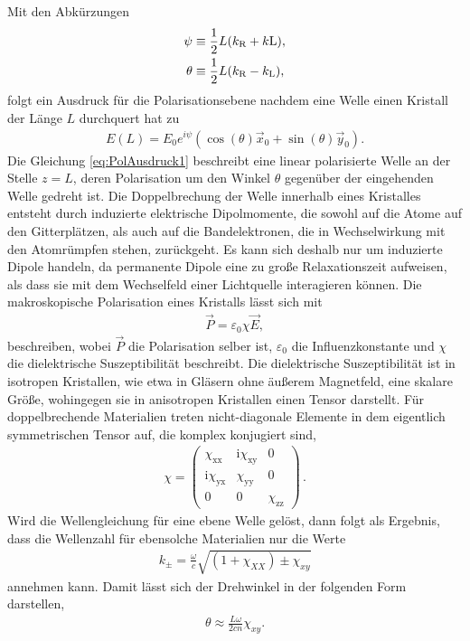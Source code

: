 \noindent
Mit den Abkürzungen
\begin{align}
    \psi&\equiv\frac 12L(k_{\text R}+k{\text L}), \\
    \theta &\equiv \frac 12L(k_{\text R}-k_{\text L}),
\end{align}
folgt ein Ausdruck für die Polarisationsebene nachdem eine Welle einen Kristall der Länge $L$ durchquert hat zu
\begin{align}
    \label{eq:PolAusdruck1}
    E(L)=E_0e^{i\psi}(\cos(\theta)\vec x_0+\sin(\theta)\vec y_0).
\end{align}
Die Gleichung \eqref{eq:PolAusdruck1} beschreibt eine linear polarisierte Welle an der Stelle $z=L$, deren Polarisation um den Winkel $\theta$ gegenüber der eingehenden Welle 
gedreht ist. Die Doppelbrechung der Welle innerhalb eines Kristalles entsteht durch induzierte elektrische Dipolmomente, die sowohl auf die Atome auf den Gitterplätzen, als auch 
auf die Bandelektronen, die in Wechselwirkung mit den Atomrümpfen stehen, zurückgeht. Es kann sich deshalb nur um induzierte Dipole handeln, da permanente Dipole eine zu große 
Relaxationszeit aufweisen, als dass sie mit dem Wechselfeld einer Lichtquelle interagieren können. \newline
Die makroskopische Polarisation eines Kristalls lässt sich mit
\begin{align}
    \vec P=\varepsilon_0\chi\vec E,
\end{align}
beschreiben, wobei $\vec P$ die Polarisation selber ist, $\varepsilon_0$ die Influenzkonstante und $\chi$ die dielektrische Suszeptibilität beschreibt. Die dielektrische Suszeptibilität
ist in isotropen Kristallen, wie etwa in Gläsern ohne äußerem Magnetfeld, eine skalare Größe, wohingegen sie in anisotropen Kristallen einen Tensor darstellt. Für doppelbrechende
Materialien treten nicht-diagonale Elemente in dem eigentlich symmetrischen Tensor auf, die komplex konjugiert sind,
\begin{align}
    \chi=
  \left( {\begin{array}{ccc}
   \chi_\text{xx} & \text{i}\chi_\text{xy} & 0\\
   \text{i}\chi_\text{yx} & \chi_\text{yy} & 0\\
   0 & 0 &\chi_\text{zz}
  \end{array} } \right)\,.
\end{align}
Wird die Wellengleichung für eine ebene Welle gelöst, dann folgt als Ergebnis, dass die Wellenzahl für ebensolche Materialien nur die Werte
\begin{align}
    k_\pm =\frac\omega c\sqrt{(1+\chi_{XX})\pm\chi_{xy}}
\end{align}
annehmen kann. Damit lässt sich der Drehwinkel in der folgenden Form darstellen,
\begin{align}
    \theta\approx \frac{L\omega}{2cn}\chi_{xy}.
\end{align}

